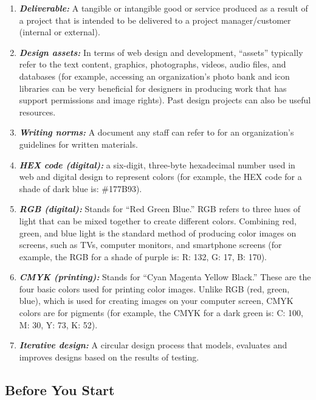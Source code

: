 \documentclass[
]{book}
\providecommand{\tightlist}{%
  \setlength{\itemsep}{0pt}\setlength{\parskip}{0pt}}
\begin{document}
\begin{enumerate}
\def\labelenumi{\arabic{enumi}.}
\tightlist
\item
  \textbf{\emph{Deliverable:}} A tangible or intangible good or service produced as a result of a project that is intended to be delivered to a project manager/customer (internal or external).
\item
  \textbf{\emph{Design assets:}} In terms of web design and development, ``assets'' typically refer to the text content, graphics, photographs, videos, audio files, and databases (for example, accessing an organization's photo bank and icon libraries can be very beneficial for designers in producing work that has support permissions and image rights). Past design projects can also be useful resources.
\item
  \textbf{\emph{Writing norms:}} A document any staff can refer to for an organization's guidelines for written materials.
\item
  \textbf{\emph{HEX code (digital):}} a six-digit, three-byte hexadecimal number used in web and digital design to represent colors (for example, the HEX code for a shade of dark blue is: \#177B93).
\item
  \textbf{\emph{RGB (digital):}} Stands for ``Red Green Blue.'' RGB refers to three hues of light that can be mixed together to create different colors. Combining red, green, and blue light is the standard method of producing color images on screens, such as TVs, computer monitors, and smartphone screens (for example, the RGB for a shade of purple is: R: 132, G: 17, B: 170).
\item
  \textbf{\emph{CMYK (printing):}} Stands for ``Cyan Magenta Yellow Black.'' These are the four basic colors used for printing color images. Unlike RGB (red, green, blue), which is used for creating images on your computer screen, CMYK colors are for pigments (for example, the CMYK for a dark green is: C: 100, M: 30, Y: 73, K: 52).
\item
  \textbf{\emph{Iterative design:}} A circular design process that models, evaluates and improves designs based on the results of testing.
\end{enumerate}

\hypertarget{before-you-start}{%
\subsection{Before You Start}\label{before-you-start}}
\end{document}
